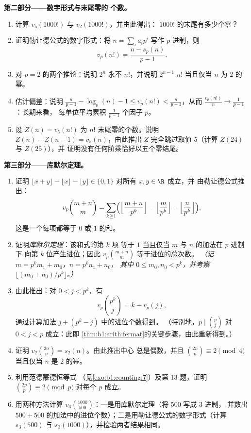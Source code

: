 \begin{problem}
\medskip
\noindent\textbf{第二部分——数字形式与末尾零的
个数。}
\begin{enumerate}[resume]
  \item 计算 $v_5(1000!)$ 与 $v_2(1000!)$，并由此得出：
        $1000!$ 的末尾有多少个零？
  \item 证明勒让德公式的数字形式：将 $n =
        \sum_i a_i p^i$ 写作 $p$ 进制，则
        \[
        v_p(n!) = \frac{n - s_p(n)}{p - 1} .
        \]
  \item 对 $p = 2$ 的两个推论：说明 $2^n$ 永不
         $n!$，并说明 $2^{n-1}$  $n!$ 当且仅当
        $n$ 为 $2$ 的幂。
  \item 估计偏差：说明 $\frac n{p-1} - \log_p(n) - 1 \leq
        v_p(n!) < \frac n{p-1}$，从而 $\frac{v_p(n!)}{n} \to
        \frac1{p-1}$：长期来看，
        每单位平均累积 $\frac1{p-1}$ 个因子 $p$。
  \item 设 $Z(n) = v_5(n!)$ 为
        $n!$ 末尾零的个数。说明 $Z(n) - Z(n-1) = v_5(n)$，由此推出 $Z$
        完全跳过取值 $5$（计算 $Z(24)$ 与 $Z(25)$），并
        证明没有任何阶乘恰好以五个零结尾。
\end{enumerate}

\medskip
\noindent\textbf{第三部分——库默尔定理。}
\begin{enumerate}[resume]
  \item 证明 $\lfloor x + y \rfloor - \lfloor x \rfloor -
        \lfloor y \rfloor \in \{0, 1\}$ 对所有 $x, y \in \R$ 成立，并
        由勒让德公式推出：
        \[
        v_p\binom{m+n}m
        = \sum_{k\geq1}\Bigl(
        \Bigl\lfloor\frac{m+n}{p^k}\Bigr\rfloor
        - \Bigl\lfloor\frac{m}{p^k}\Bigr\rfloor
        - \Bigl\lfloor\frac{n}{p^k}\Bigr\rfloor\Bigr),
        \]
        这是一个每项都等于 $0$ 或 $1$ 的和。
  \item 证明\emph{库默尔定理}：该和式的第 $k$ 项
        等于 $1$ 当且仅当 $m$ 与 $n$ 的加法在 $p$ 进制下
        向第 $k$ 位产生进位；因此
        $v_p\binom{m+n}m$ 等于进位的总次数。
        \emph{（记 $m = p^km_1 + m_0$，$n = p^kn_1 + n_0$，
        其中 $0 \leq m_0, n_0 < p^k$，并考察 $\lfloor (m_0 +
        n_0)/p^k \rfloor$。）}
  \item 由此推出：对 $0 < j < p^k$，有
        \[
        v_p\binom{p^k}{j} = k - v_p(j) ,
        \]
        通过计算加法 $j + (p^k - j)$ 中的进位个数得到。
        （特别地，$p \mid \binom p j$ 对 $0 < j < p$ 成立：此即
        \cref{thm:b1:arith:fermat}的关键步骤，由此重新得到。）
  \item 证明 $v_2\binom{2n}n = s_2(n)$。由此推出中心
        总是偶数，并且 $\binom{2n}n \equiv 2 \pmod 4$
        当且仅当 $n$ 是
        $2$ 的幂。
  \item 利用范德蒙德恒等式
        （见\cref{exo:b1:counting:7}）及第 13 题，证明
        $\binom{2p}p \equiv 2 \pmod p$ 对每个 $p$ 成立。
  \item 用两种方法计算 $v_3\binom{1000}{500}$：一是用库默尔定理（将 $500$ 写成 $3$ 进制，
        并数出 $500 +
        500$ 的加法中的进位个数）；二是用勒让德公式的数字形式（计算 $s_3(500)$
        与 $s_3(1000)$），并检验两者结果相同。
\end{enumerate}


\end{problem}
